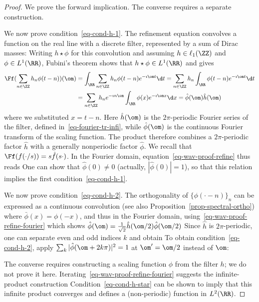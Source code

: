 \begin{proof} We prove the forward implication. The converse requires a separate construction.

We now prove condition~\eqref{eq-cond-h-1}.
%
The refinement equation convolves a function on the real line with a discrete filter, represented by a sum of Dirac masses:
%
Writing $h \star \phi$ for this convolution and assuming $h \in \ell_1(\ZZ)$ and $\phi \in L^1(\RR)$, Fubini's theorem shows that $h \star \phi \in L^1(\RR)$ and gives
\begin{align*}
	\Ff( \sum_{n \in \ZZ} h_n \phi(t-n) )(\om) &= \int_\RR \sum_{n \in \ZZ} h_n \phi(t-n) e^{-\imath \om t} \d t
	= \sum_{n \in \ZZ} h_n \int_\RR \phi(t-n) e^{-\imath \om t} \d t \\
	& = \sum_{n \in \ZZ} h_n e^{-\imath n \om } \int_\RR \phi(x) e^{-\imath \om x} \d x
	= \hat \phi(\om) \hat h(\om)
\end{align*}
where we substituted $x = t-n$. Here $\hat h(\om)$ is the $2\pi$-periodic Fourier series of the filter, defined in~\eqref{eq-fourier-tr-infi}, while $\hat\phi(\om)$ is the continuous Fourier transform of the scaling function. The product therefore combines a $2\pi$-periodic factor $\hat h$ with a generally nonperiodic factor $\hat \phi$.
%
We recall that $\Ff(f(\cdot/s)) = s \hat f(s \cdot)$.
%
In the Fourier domain, equation~\eqref{eq-wav-proof-refine} thus reads
One can show that $\hat \phi(0) \neq 0$ (actually, $|\hat \phi(0)| = 1$), so that this relation implies the first condition~\eqref{eq-cond-h-1}.


We now prove condition~\eqref{eq-cond-h-2}.
%
The orthogonality of $\{\phi(\cdot-n)\}_n$ can be expressed as a continuous convolution (see also Proposition~\ref{prop-spectral-ortho})
where $\bar \phi(x) = \phi(-x)$, 
and thus in the Fourier domain, using~\eqref{eq-wav-proof-refine-fourier} which shows $\hat\phi(\om) = \frac{1}{\sqrt{2}}\hat h(\om/2) \hat \phi(\om/2)$
Since $\hat h$ is $2\pi$-periodic, one can separate even and odd indices $k$ and obtain
To obtain condition~\eqref{eq-cond-h-2}, apply $\sum_k |\hat \phi(\om+2k\pi)|^2=1$ at $\om'=\om/2$ instead of $\om$:

The converse requires constructing a scaling function $\phi$ from the filter $h$; we do not prove it here. Iterating~\eqref{eq-wav-proof-refine-fourier} suggests the infinite-product construction
Condition~\eqref{eq-cond-h-star} can be shown to imply that this infinite product converges and defines a (non-periodic) function in $L^2(\RR)$.
\end{proof}


